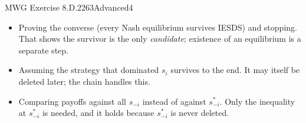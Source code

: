 \begin{exsol}{MWG Exercise 8.D.2}{263}{Advanced}{4}
\mistakes
\begin{itemize}
  \item Proving the converse (every Nash equilibrium survives IESDS) and stopping. That shows the
  survivor is the only \emph{candidate}; existence of an equilibrium is a separate step.
  \item Assuming the strategy that dominated $s_i$ survives to the end. It may itself be deleted
  later; the chain handles this.
  \item Comparing payoffs against all $s_{-i}$ instead of against $s^*_{-i}$. Only the inequality
  at $s^*_{-i}$ is needed, and it holds because $s^*_{-i}$ is never deleted.
\end{itemize}

\end{exsol}
